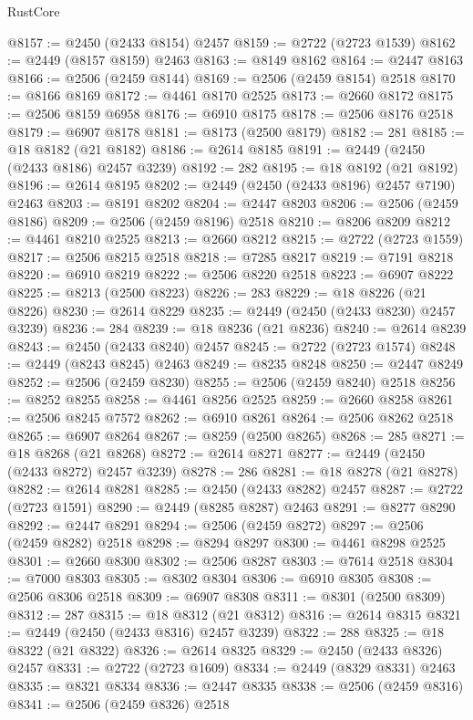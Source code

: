 \begin{lexlean}{RustCore}
\begin{coremodule}
@8157 := @2450 (@2433 @8154) @2457
@8159 := @2722 (@2723 @1539)
@8162 := @2449 (@8157 @8159) @2463
@8163 := @8149 @8162
@8164 := @2447 @8163
@8166 := @2506 (@2459 @8144)
@8169 := @2506 (@2459 @8154) @2518
@8170 := @8166 @8169
@8172 := @4461 @8170 @2525
@8173 := @2660 @8172
@8175 := @2506 @8159 @6958
@8176 := @6910 @8175
@8178 := @2506 @8176 @2518
@8179 := @6907 @8178
@8181 := @8173 (@2500 @8179)
@8182 := 281
@8185 := @18 @8182 (@21 @8182)
@8186 := @2614 @8185
@8191 := @2449 (@2450 (@2433 @8186) @2457 @3239)
@8192 := 282
@8195 := @18 @8192 (@21 @8192)
@8196 := @2614 @8195
@8202 := @2449 (@2450 (@2433 @8196) @2457 @7190) @2463
@8203 := @8191 @8202
@8204 := @2447 @8203
@8206 := @2506 (@2459 @8186)
@8209 := @2506 (@2459 @8196) @2518
@8210 := @8206 @8209
@8212 := @4461 @8210 @2525
@8213 := @2660 @8212
@8215 := @2722 (@2723 @1559)
@8217 := @2506 @8215 @2518
@8218 := @7285 @8217
@8219 := @7191 @8218
@8220 := @6910 @8219
@8222 := @2506 @8220 @2518
@8223 := @6907 @8222
@8225 := @8213 (@2500 @8223)
@8226 := 283
@8229 := @18 @8226 (@21 @8226)
@8230 := @2614 @8229
@8235 := @2449 (@2450 (@2433 @8230) @2457 @3239)
@8236 := 284
@8239 := @18 @8236 (@21 @8236)
@8240 := @2614 @8239
@8243 := @2450 (@2433 @8240) @2457
@8245 := @2722 (@2723 @1574)
@8248 := @2449 (@8243 @8245) @2463
@8249 := @8235 @8248
@8250 := @2447 @8249
@8252 := @2506 (@2459 @8230)
@8255 := @2506 (@2459 @8240) @2518
@8256 := @8252 @8255
@8258 := @4461 @8256 @2525
@8259 := @2660 @8258
@8261 := @2506 @8245 @7572
@8262 := @6910 @8261
@8264 := @2506 @8262 @2518
@8265 := @6907 @8264
@8267 := @8259 (@2500 @8265)
@8268 := 285
@8271 := @18 @8268 (@21 @8268)
@8272 := @2614 @8271
@8277 := @2449 (@2450 (@2433 @8272) @2457 @3239)
@8278 := 286
@8281 := @18 @8278 (@21 @8278)
@8282 := @2614 @8281
@8285 := @2450 (@2433 @8282) @2457
@8287 := @2722 (@2723 @1591)
@8290 := @2449 (@8285 @8287) @2463
@8291 := @8277 @8290
@8292 := @2447 @8291
@8294 := @2506 (@2459 @8272)
@8297 := @2506 (@2459 @8282) @2518
@8298 := @8294 @8297
@8300 := @4461 @8298 @2525
@8301 := @2660 @8300
@8302 := @2506 @8287
@8303 := @7614 @2518
@8304 := @7000 @8303
@8305 := @8302 @8304
@8306 := @6910 @8305
@8308 := @2506 @8306 @2518
@8309 := @6907 @8308
@8311 := @8301 (@2500 @8309)
@8312 := 287
@8315 := @18 @8312 (@21 @8312)
@8316 := @2614 @8315
@8321 := @2449 (@2450 (@2433 @8316) @2457 @3239)
@8322 := 288
@8325 := @18 @8322 (@21 @8322)
@8326 := @2614 @8325
@8329 := @2450 (@2433 @8326) @2457
@8331 := @2722 (@2723 @1609)
@8334 := @2449 (@8329 @8331) @2463
@8335 := @8321 @8334
@8336 := @2447 @8335
@8338 := @2506 (@2459 @8316)
@8341 := @2506 (@2459 @8326) @2518

\end{coremodule}
\end{lexlean}
